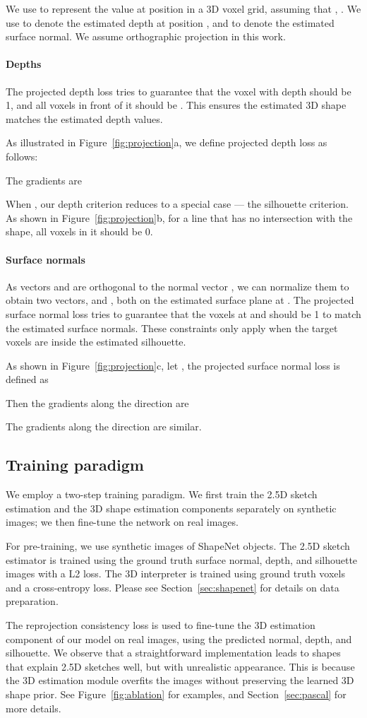 \documentclass{article}
\newcommand{\sect}[1]{Section~\ref{#1}}
\newcommand{\fig}[1]{Figure~\ref{#1}}
\newcommand{\myparagraph}[1]{\vspace{-3pt}\paragraph{#1}}
\begin{document}
We use  to represent the value at position  in a 3D voxel grid, assuming that , . We use  to denote the estimated depth at position , and  to denote the estimated surface normal. We assume orthographic projection in this work. 

\myparagraph{Depths}
The projected depth loss tries to guarantee that the voxel with depth  should be 1, and all voxels in front of it should be . This ensures the estimated 3D shape matches the estimated depth values.

As illustrated in \fig{fig:projection}a, we define projected depth loss as follows:

The gradients are


When , our depth criterion reduces to a special case --- the silhouette criterion. As shown in \fig{fig:projection}b, for a line that has no intersection with the shape, all voxels in it should be 0.
	
\myparagraph{Surface normals}
As vectors  and  are orthogonal to the normal vector , we can normalize them to obtain two vectors,  and , both on the estimated surface plane at . The projected surface normal loss tries to guarantee that the voxels at  and  should be 1 to match the estimated surface normals. These constraints only apply when the target voxels are inside the estimated silhouette.

As shown in \fig{fig:projection}c, let , the projected surface normal loss is defined as

Then the gradients along the  direction are

The gradients along the  direction are similar.

\subsection{Training paradigm}
\label{sec:train}

We employ a two-step training paradigm. We first train the 2.5D sketch estimation and the 3D shape estimation components separately on synthetic images; we then fine-tune the network on real images.

For pre-training, we use synthetic images of ShapeNet objects. The 2.5D sketch estimator is trained using the ground truth surface normal, depth, and silhouette images with a L2 loss. The 3D interpreter is trained using ground truth voxels and a cross-entropy loss. Please see \sect{sec:shapenet} for details on data preparation. 

The reprojection consistency loss is used to fine-tune the 3D estimation component of our model on real images, using the predicted normal, depth, and silhouette. We observe that a straightforward implementation leads to shapes that explain 2.5D sketches well, but with unrealistic appearance. This is because the 3D estimation module overfits the images without preserving the learned 3D shape prior. See \fig{fig:ablation} for examples, and \sect{sec:pascal} for more details.
\end{document}
